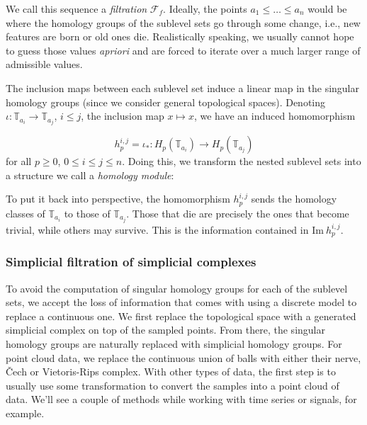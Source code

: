   We call this sequence a \textit{filtration} $\mathcal{F}_{f}$. Ideally, the points $a_{1} \leq \ldots \leq a_{n}$ would be where the homology groups of the sublevel sets go through some change, i.e., new features are born or old ones die. Realistically speaking, we usually cannot hope to guess those values \textit{apriori} and are forced to iterate over a much larger range of admissible values.

  The inclusion maps between each sublevel set induce a linear map in the singular homology groups (since we consider general topological spaces). Denoting $\iota: \mathbb{T}_{a_{i}} \to \mathbb{T}_{a_{j}}$, $i \leq j$, the inclusion map $x \mapsto x$, we have an induced homomorphism

  \begin{equation*}
    h_{p}^{i,j} = \iota_{*}: H_{p}(\mathbb{T}_{a_{i}}) \to H_{p}(\mathbb{T}_{a_{j}})
  \end{equation*}
  for all $p \geq 0$, $0 \leq i \leq j \leq n$. Doing this, we transform the nested sublevel sets into a structure we call a \textit{homology module}:

  \begin{figure}[h]
    \centering
  \end{figure}

  To put it back into perspective, the homomorphism $h_{p}^{i,j}$ sends the homology classes of $\mathbb{T}_{a_{i}}$ to those of $\mathbb{T}_{a_{j}}$. Those that die are precisely the ones that become trivial, while others may survive. This is the information contained in $\text{Im}\:h_{p}^{i,j}$.

  \subsubsection{Simplicial filtration of simplicial complexes}
  To avoid the computation of singular homology groups for each of the sublevel sets, we accept the loss of information that comes with using a discrete model to replace a continuous one. We first replace the topological space with a generated simplicial complex on top of the sampled points. From there, the singular homology groups are naturally replaced with simplicial homology groups. For point cloud data, we replace the continuous union of balls with either their nerve, Čech or Vietoris-Rips complex. With other types of data, the first step is to usually use some transformation to convert the samples into a point cloud of data. We'll see a couple of methods while working with time series or signals, for example.


